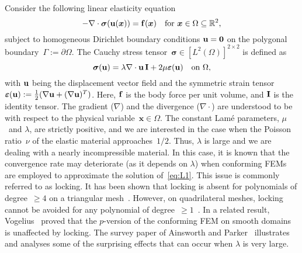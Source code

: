 \documentclass[11pt]{article}
\newcommand{\vf}{{\bf f}}
\newcommand{\vu}{{\bf u}}
\newcommand{\bsx}{{\boldsymbol{x}}}
\newcommand{\vsigma}{\boldsymbol{\sigma}}
\newcommand{\R}{\mathbb{R}}
\numberwithin{equation}{section}
\newcommand{\veps}{{\boldsymbol{\varepsilon}}}
\begin{document}
Consider the following linear elasticity equation 
\begin{equation}
 -\nabla \cdot \vsigma(\vu(\bsx)) = \vf(\bsx) \quad \text{for $\bsx \in \Omega\subseteq\R^2$,}
\label{eq:L1}
\end{equation}
subject to homogeneous Dirichlet boundary conditions $\vu = {\bf 0}$ on the
polygonal boundary~$\Gamma:=\partial \Omega$. The   Cauchy stress
tensor~$\vsigma \in [L^2(\Omega)]^{2\times 2}$ is defined as 
\[\vsigma(\vu) = \lambda \nabla\cdot \vu\, {\bf I} 
+ 2\mu \veps(\vu)\quad\text{on $\Omega$,} \] 
with $\vu$ being the displacement vector field and the symmetric strain 
tensor~$\veps(\vu) := \frac{1}{2} (\nabla \vu + (\nabla \vu)^T)$. Here, $\vf$ is
the body force per unit volume, and ${\bf I}$ is the identity tensor.   The
gradient ($\nabla$) and the divergence ($\nabla \cdot$) are understood to be
with respect to the physical variable~$\bsx \in \Omega$.  The constant Lam\'e
parameters, $\mu$~and $\lambda$, are strictly positive, and we are interested
in the case when the Poisson ratio~$\nu$ of the elastic material
approaches~$1/2$.  Thus, $\lambda$ is large and we are dealing with a nearly
incompressible material. {\color{red} In this case, it is known that the
convergence rate may deteriorate (as it depends on $\lambda$) when conforming
FEMs are employed to approximate the solution of~\eqref{eq:L1}. This issue is
commonly referred to as locking. It has been shown that locking is absent for
polynomials of degree~$\ge 4$ on a triangular mesh~\cite{ScottVogelius1985}.
However, on quadrilateral meshes, locking cannot be  avoided for any polynomial
of degree~$\ge1$~\cite{BabuskaSuri1992}.  In a related result,
Vogelius~\cite{Vogelius1983} proved that the $p$-version of the conforming FEM
on smooth domains is  unaffected by locking. The survey paper of Ainsworth and
Parker~\cite{AinsworthParker2022} illustrates and analyses some of the
surprising effects that can occur when $\lambda$ is very large.}
\end{document}
